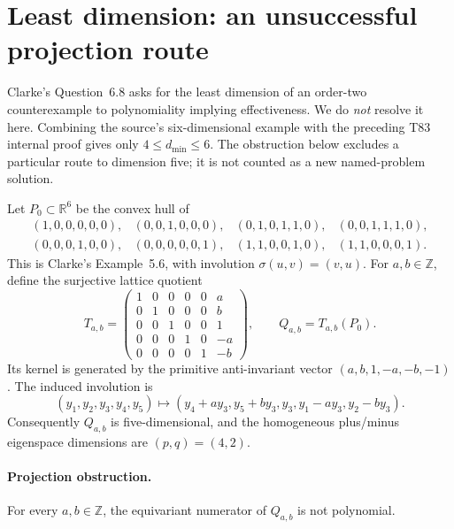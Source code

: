 \documentclass[11pt,a4paper]{article}
\theoremstyle{definition}\newtheorem{definition}[theorem]{Definition}
\theoremstyle{remark}\newtheorem{remark}[theorem]{Remark}
\begin{document}
\appendix

\section{Least dimension: an unsuccessful projection route}
\label{sec:ehrhart-projection-audit}

Clarke's Question~6.8 \cite{Clarke26} asks for the least dimension of an
order-two counterexample to polynomiality implying effectiveness. We do
\emph{not} resolve it here. Combining the source's six-dimensional example
with the preceding T83 internal proof \cite{Keio81} gives only
$4\leq d_{\min}\leq6$. The obstruction below excludes a particular route
to dimension five; it is not counted as a new named-problem solution.

Let $P_0\subset\mathbb R^6$ be the convex hull of
\[
\begin{array}{llll}
(1,0,0,0,0,0),&(0,0,1,0,0,0),&(0,1,0,1,1,0),&(0,0,1,1,1,0),\\
(0,0,0,1,0,0),&(0,0,0,0,0,1),&(1,1,0,0,1,0),&(1,1,0,0,0,1).
\end{array}
\]
This is Clarke's Example~5.6, with involution $\sigma(u,v)=(v,u)$.
For $a,b\in\mathbb Z$, define the surjective lattice quotient
\[
 T_{a,b}=
 \begin{pmatrix}
 1&0&0&0&0&a\\0&1&0&0&0&b\\0&0&1&0&0&1\\
 0&0&0&1&0&-a\\0&0&0&0&1&-b
 \end{pmatrix},\qquad Q_{a,b}=T_{a,b}(P_0).
\]
Its kernel is generated by the primitive anti-invariant vector
$(a,b,1,-a,-b,-1)$. The induced involution is
\[
 (y_1,y_2,y_3,y_4,y_5)\longmapsto
 (y_4+ay_3,y_5+by_3,y_3,y_1-ay_3,y_2-by_3).
\]
Consequently $Q_{a,b}$ is five-dimensional, and the homogeneous
plus/minus eigenspace dimensions are $(p,q)=(4,2)$.

\paragraph{Projection obstruction.}
For every $a,b\in\mathbb Z$, the equivariant numerator of $Q_{a,b}$
is not polynomial.
\end{document}
